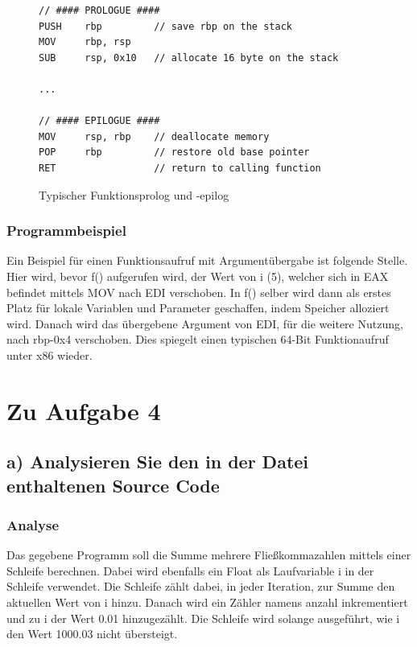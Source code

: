 \documentclass[12pt]{article}
\begin{document}
\begin{figure}[H]
\begin{lstlisting}
// #### PROLOGUE ####
PUSH	rbp			// save rbp on the stack
MOV		rbp, rsp
SUB		rsp, 0x10	// allocate 16 byte on the stack

...

// #### EPILOGUE ####
MOV		rsp, rbp	// deallocate memory
POP		rbp			// restore old base pointer
RET					// return to calling function
\end{lstlisting}
\label{lst:epipro}
\caption{Typischer Funktionsprolog und -epilog}
\end{figure}

\subsubsection*{Programmbeispiel}
Ein Beispiel für einen Funktionsaufruf mit Argumentübergabe ist folgende Stelle.
Hier wird, bevor f() aufgerufen wird, der Wert von i (5), welcher sich in EAX befindet mittels MOV nach EDI verschoben. In f() selber wird dann als erstes Platz für lokale Variablen und Parameter geschaffen, indem Speicher alloziert wird.
Danach wird das übergebene Argument von EDI, für die weitere Nutzung, nach rbp-0x4 verschoben. Dies spiegelt einen typischen 64-Bit Funktionaufruf unter x86 wieder. 

\newpage
\section{Zu Aufgabe 4}
\subsection{a) Analysieren Sie den in der Datei enthaltenen Source Code}
\subsubsection{Analyse}
Das gegebene Programm soll die Summe mehrere Fließkommazahlen mittels einer Schleife berechnen. Dabei wird ebenfalls ein Float als Laufvariable i in der Schleife verwendet. Die Schleife zählt dabei, in jeder Iteration, zur Summe den aktuellen Wert von i hinzu. Danach wird ein Zähler namens anzahl inkrementiert und zu i der Wert 0.01 hinzugezählt. Die Schleife wird solange ausgeführt, wie i den Wert 1000.03 nicht übersteigt.
\end{document}
